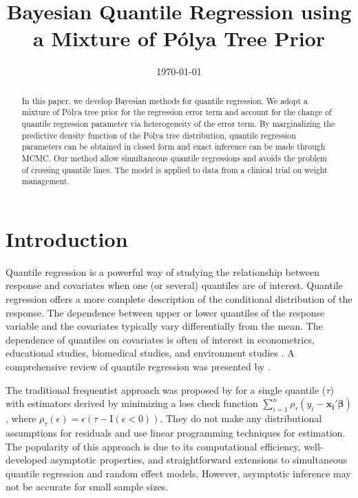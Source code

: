 \documentclass[12pt]{article}
\title{Bayesian Quantile Regression using a  Mixture of P\'{o}lya Tree Prior}
\date{\today}
\author{}
\newcommand{\polya}{P\'{o}lya}
\begin{document}

\maketitle{}

\begin{abstract}
In this paper, we develop Bayesian methods for quantile regression.
We adopt a mixture of \polya{} tree prior for the regression error term
and account for the change of quantile regression parameter via heterogeneity of the error term.
By marginalizing the predictive density function of the \polya{} tree distribution,
quantile regression parameters can be obtained in closed form and exact inference can be made through MCMC.
Our method allow simultaneous quantile regressions and avoids the problem of crossing quantile lines.
The model is applied to data from a clinical trial on weight management.
\end{abstract}

\section{Introduction}

Quantile regression is a powerful way of studying the relationship
between response and covariates when one (or several) quantiles are of
interest.
Quantile regression offers a more complete description of the
conditional distribution of the response.
The dependence between upper or lower quantiles of the
response variable and the covariates typically vary
differentially from the mean. The dependence of quantiles on covariates is often of
interest in econometrics, educational studies, biomedical studies, and
environment studies \citep{yu2001,buchinsky1994,
  buchinsky1998,he1998,koenker1999, wei2006, yu2003}.  A comprehensive
review of quantile regression was presented by \citet{koenker2005}.

The traditional frequentist approach was proposed by
\citet{koenker1978} for a single quantile ($\tau$) with estimators
derived by minimizing a loss check function $\sum_{i=1}^n
\rho_{\tau}(y_i - \bm{x_i'\beta})$, where $\rho_{\tau}(\epsilon) =
\epsilon (\tau- \mathrm{I}(\epsilon < 0))$. They do not make any
distributional assumptions for residuals and use linear programming
techniques for estimation.  The popularity of this approach is due to
its computational efficiency, well-developed asymptotic properties,
and straightforward extensions to simultaneous quantile regression and
random effect models. However, asymptotic inference may not be
accurate for small sample sizes.
\end{document}
